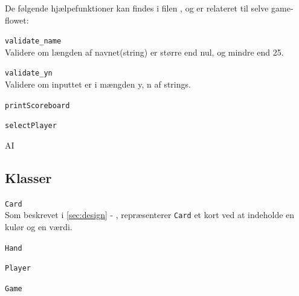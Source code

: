 \documentclass[a4paper]{article}
\newcommand{\namedref}[1]{\autoref{#1} - \nameref{#1}}
\begin{document}
      De følgende hjælpefunktioner kan findes i filen , og er relateret til selve game-flowet:
      \begin{description}
        \item{\texttt{validate\_name}}~\\
          Validere om længden af navnet(string) er større end nul,
          og mindre end 25.
      
        \item{\texttt{validate\_yn}}~\\
          Validere om inputtet er i mængden {y, n} af strings.

        \item{\texttt{printScoreboard}}~\\

        \item{\texttt{selectPlayer}}~\\

        \item{AI}~\\
      \end{description}
      
    \subsection{Klasser} \label{ssec:classes}
      \begin{description}
        \item{\texttt{\texttt{Card}}}~\\
          Som beskrevet i \namedref{sec:design}, repræsenterer \texttt{Card} et kort ved at indeholde en kulør og en værdi.
          
        \item{\texttt{\texttt{Hand}}}~\\
        \item{\texttt{\texttt{Player}}}~\\
        \item{\texttt{Game}}~\\
      \end{description}
    
\end{document}
